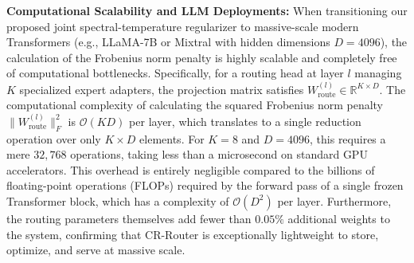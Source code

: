 \textbf{Computational Scalability and LLM Deployments:}
When transitioning our proposed joint spectral-temperature regularizer to massive-scale modern Transformers (e.g., LLaMA-7B or Mixtral with hidden dimensions $D = 4096$), the calculation of the Frobenius norm penalty is highly scalable and completely free of computational bottlenecks. Specifically, for a routing head at layer $l$ managing $K$ specialized expert adapters, the projection matrix satisfies $W_{\text{route}}^{(l)} \in \mathbb{R}^{K \times D}$. The computational complexity of calculating the squared Frobenius norm penalty $\|W_{\text{route}}^{(l)}\|_F^2$ is $\mathcal{O}(KD)$ per layer, which translates to a single reduction operation over only $K \times D$ elements. For $K = 8$ and $D = 4096$, this requires a mere $32,768$ operations, taking less than a microsecond on standard GPU accelerators. This overhead is entirely negligible compared to the billions of floating-point operations (FLOPs) required by the forward pass of a single frozen Transformer block, which has a complexity of $\mathcal{O}(D^2)$ per layer. Furthermore, the routing parameters themselves add fewer than $0.05\%$ additional weights to the system, confirming that CR-Router is exceptionally lightweight to store, optimize, and serve at massive scale.
